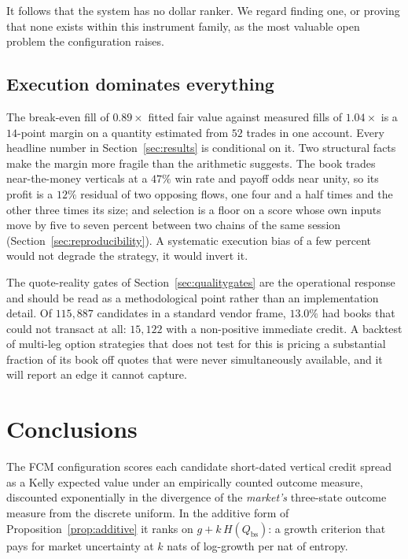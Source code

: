 \documentclass[11pt]{article}
\newcommand{\Qbs}{Q_{\mathrm{bs}}}
\begin{document}
It follows that the system has no dollar ranker. We regard finding one, or
proving that none exists within this instrument family, as the most valuable
open problem the configuration raises.

\subsection{Execution dominates everything}

The break-even fill of $0.89\times$ fitted fair value against measured fills
of $1.04\times$ is a $14$-point margin on a quantity estimated from $52$
trades in one account. Every headline number in Section~\ref{sec:results} is
conditional on it. Two structural facts make the margin more fragile than the
arithmetic suggests. The book trades near-the-money verticals at a $47\%$ win
rate and payoff odds near unity, so its profit is a $12\%$ residual of two
opposing flows, one four and a half times and the other three times its
size; and selection is a floor on a score whose own
inputs move by five to seven percent between two chains of the same session
(Section~\ref{sec:reproducibility}). A systematic execution bias of a few
percent would not degrade the strategy, it would invert it.

The quote-reality gates of Section~\ref{sec:qualitygates} are the operational
response and should be read as a methodological point rather than an
implementation detail. Of $115{,}887$ candidates in a standard vendor frame,
$13.0\%$ had books that could not transact at all: $15{,}122$ with a
non-positive immediate credit. A backtest of multi-leg option strategies that
does not test for this is pricing a substantial fraction of its book off
quotes that were never simultaneously available, and it will report an edge it
cannot capture.

\section{Conclusions}
\label{sec:conclusions}

The FCM configuration scores each candidate short-dated vertical credit spread
as a Kelly expected value under an empirically counted outcome measure,
discounted exponentially in the divergence of the \emph{market's} three-state
outcome measure from the discrete uniform. In the additive form of
Proposition~\ref{prop:additive} it ranks on
$g + k\,H(\Qbs)$: a growth criterion that pays for market uncertainty at $k$
nats of log-growth per nat of entropy.
\end{document}
